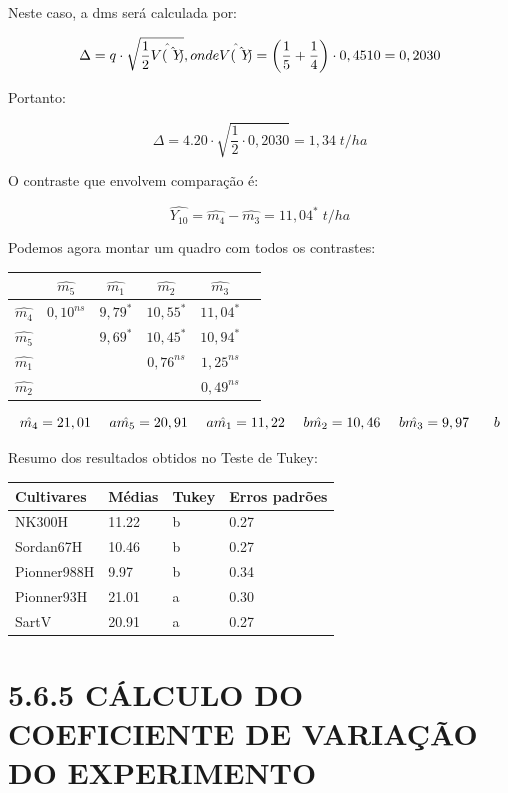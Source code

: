 \documentclass[
]{book}
\begin{document}
Neste caso, a dms será calculada por:

\[
\Delta = q\cdot\sqrt{\frac{1}{2}\hat{V(\hat{Y})}}, onde \\
\hat{V(\hat{Y})}= \left( \frac{1}{5}+\frac{1}{4} \right)\cdot0,4510 = 0,2030
\]

Portanto:

\[
\Delta = 4.20\cdot\sqrt{\frac{1}{2}\cdot0,2030} = 1,34\;t/ha
\]

O contraste que envolvem comparação é:

\[
\hat{Y_{10}} = \hat{m_4} - \hat{m_3} = 11,04^{*}\;t/ha 
\]

Podemos agora montar um quadro com todos os contrastes:

\begin{longtable}[]{@{}cccccc@{}}
\toprule
& \(\hat{m_5}\) & \(\hat{m_1}\) & \(\hat{m_2}\) & \(\hat{m_3}\) &\tabularnewline
\midrule
\endhead
\(\hat{m_4}\) & \(0,10^{ns}\) & \(9,79^{*}\) & \(10,55^{*}\) & \(11,04^{*}\) &\tabularnewline
\(\hat{m_5}\) & & \(9,69^{*}\) & \(10,45^{*}\) & \(10,94^{*}\) &\tabularnewline
\(\hat{m_1}\) & & & \(0,76^{ns}\) & \(1,25^{ns}\) &\tabularnewline
\(\hat{m_2}\) & & & & \(0,49^{ns}\) &\tabularnewline
\bottomrule
\end{longtable}

\[
\hat{m_4}=21,01 \:\:\:\:\:\: a\\
\hat{m_5}=20,91 \:\:\:\:\:\: a\\
\hat{m_1}=11,22 \:\:\:\:\:\: b\\
\hat{m_2}=10,46 \:\:\:\:\:\: b\\
\hat{m_3}=9,97 \:\:\:\:\:\:\:\:b 
\]

Resumo dos resultados obtidos no Teste de Tukey:

\begin{table}[H]
\centering
\begin{tabular}{l|l|l|l}
\hline
Cultivares & Médias & Tukey & Erros padrões\\
\hline
NK300H & 11.22 & b & 0.27\\
\hline
Sordan67H & 10.46 & b & 0.27\\
\hline
Pionner988H & 9.97 & b & 0.34\\
\hline
Pionner93H & 21.01 & a & 0.30\\
\hline
SartV & 20.91 & a & 0.27\\
\hline
\end{tabular}
\end{table}

\hypertarget{cuxe1lculo-do-coeficiente-de-variauxe7uxe3o-do-experimento}{%
\section{5.6.5 CÁLCULO DO COEFICIENTE DE VARIAÇÃO DO EXPERIMENTO}\label{cuxe1lculo-do-coeficiente-de-variauxe7uxe3o-do-experimento}}
\end{document}
